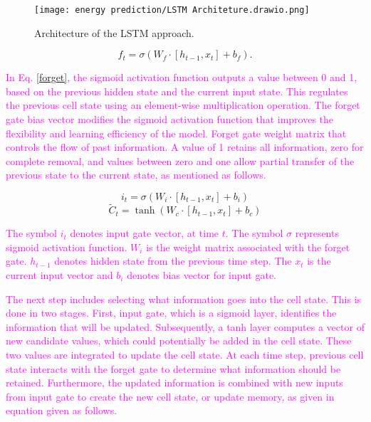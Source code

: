 \documentclass[journal]{IEEEtran}
\begin{document}
\begin{figure}[!h]
    \centering
    \texttt{[image: energy prediction/LSTM Architeture.drawio.png]}
        \caption{Architecture of the LSTM approach.}
    \label{LSTM}
\end{figure}



 

\begin{equation}\label{forget}
f_t = \sigma \left( W_f \cdot [h_{t-1}, x_t] + b_f \right).
\end{equation}


\textcolor{magenta}{In Eq. \eqref{forget}, the sigmoid activation function outputs a value between 0 and 1, based on
the previous hidden state and the current input state. This regulates the previous cell state
using an element-wise multiplication operation. The forget gate bias vector modifies the sigmoid
activation function that improves the flexibility and learning efficiency of the model. Forget gate
weight matrix that controls the flow of past information. A value of 1 retains all information,
zero for complete removal, and values between zero and one allow partial transfer of the previous
state to the current state, as mentioned as follows.}


\begin{equation}\label{input}
i_t = \sigma(W_i \cdot [h_{t-1}, x_t] + b_i)
\end{equation}
\begin{equation}\label{tanh input}
\tilde{C}_t = \tanh(W_c \cdot [h_{t-1}, x_t] + b_c)
\end{equation}

\textcolor{magenta}{The symbol $i_t$ denotes input gate vector, at time $t$. The symbol $\sigma$ represents sigmoid activation function. $W_i$ is the weight matrix associated with the forget gate. $h_{t-1}$ denotes hidden state from the previous time step. The $x_t$ is the current input vector and $b_i$ denotes bias vector for input gate.}


\textcolor{magenta}{The next step includes selecting what information goes into the cell state. This is done in two stages. First, input gate, which is a sigmoid layer, identifies the information that will be
updated. Subsequently, a tanh layer computes a vector of new candidate values, which could
potentially be added in the cell state. These two values are integrated to update the cell state. At each time step, previous cell state
interacts with the forget gate to determine what information should be retained. Furthermore,
the updated information is combined with new inputs from input gate to create the new cell
state, or update memory, as given in equation given as follows.}
\end{document}
